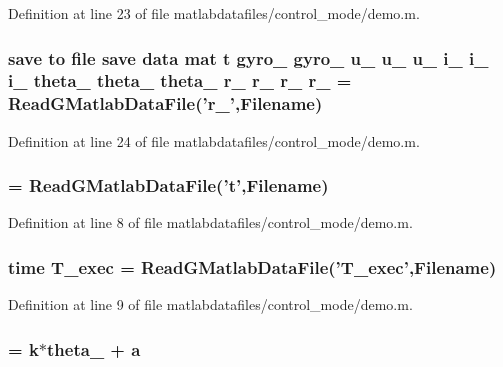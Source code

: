 Definition at line 23 of file matlabdatafiles/control\_\-mode/demo.m.
\subsubsection[{r\_\-4}]{\setlength{\rightskip}{0pt plus 5cm}save to file save {\bf data} {\bf mat} {\bf t} {\bf gyro\_} {\bf gyro\_} {\bf u\_} {\bf u\_} {\bf u\_} {\bf i\_} {\bf i\_} {\bf i\_} {\bf theta\_} {\bf theta\_} {\bf theta\_} r\_ r\_ r\_ r\_ = ReadGMatlabDataFile('r\_',{\bf Filename})}\label{matlabdatafiles_2control__mode_2demo_8m_a9e72e33c2c5326d122899bed345b87c4}


Definition at line 24 of file matlabdatafiles/control\_\-mode/demo.m.
\subsubsection[{t}]{ = ReadGMatlabDataFile('{\bf t}',{\bf Filename})}\label{matlabdatafiles_2control__mode_2demo_8m_aaccc9105df5383111407fd5b41255e23}


Definition at line 8 of file matlabdatafiles/control\_\-mode/demo.m.
\subsubsection[{T\_\-exec}]{\setlength{\rightskip}{0pt plus 5cm}time {\bf T\_\-exec} = ReadGMatlabDataFile('{\bf T\_\-exec}',{\bf Filename})}\label{matlabdatafiles_2control__mode_2demo_8m_adb469792c94cc4a97fd02941349766b9}


Definition at line 9 of file matlabdatafiles/control\_\-mode/demo.m.
\subsubsection[{theta\_\-1}]{ = {\bf k}$\ast${\bf theta\_} + {\bf a}}\label{matlabdatafiles_2control__mode_2demo_8m_ac951b784fc028491b02f210408071f00}


